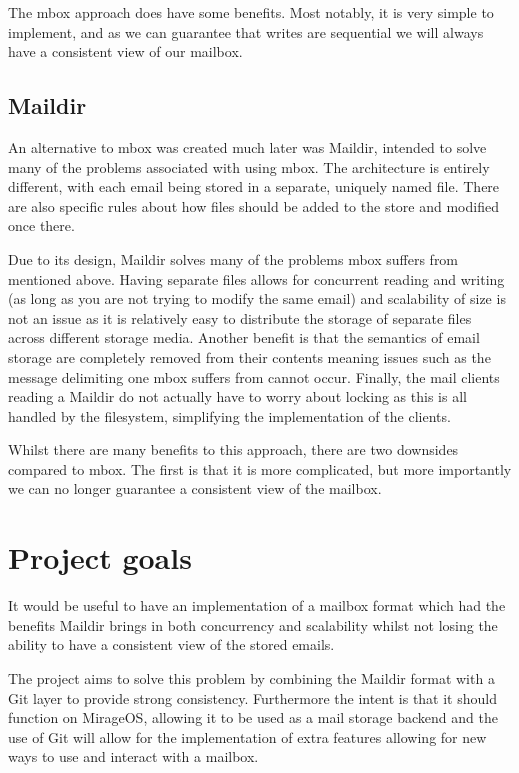 The mbox approach does have some benefits. Most notably, it is very simple to implement, and as we can guarantee that writes are sequential we will always have a consistent view of our mailbox.

\subsection{Maildir}

An alternative to mbox was created much later was Maildir, intended to solve many of the problems associated with using mbox. The architecture is entirely different, with each email being stored in a separate, uniquely named file. There are also specific rules about how files should be added to the store and modified once there.

Due to its design, Maildir solves many of the problems mbox suffers from mentioned above. Having separate files allows for concurrent reading and writing (as long as you are not trying to modify the same email) and scalability of size is not an issue as it is relatively easy to distribute the storage of separate files across different storage media. Another benefit is that the semantics of email storage are completely removed from their contents meaning issues such as the message delimiting one mbox suffers from cannot occur. Finally, the mail clients reading a Maildir do not actually have to worry about locking as this is all handled by the filesystem, simplifying the implementation of the clients.

Whilst there are many benefits to this approach, there are two downsides compared to mbox. The first is that it is more complicated, but more importantly we can no longer guarantee a consistent view of the mailbox.

\section{Project goals}

It would be useful to have an implementation of a mailbox format which had the benefits Maildir brings in both concurrency and scalability whilst not losing the ability to have a consistent view of the stored emails.

The project aims to solve this problem by combining the Maildir format with a Git layer to provide strong consistency. Furthermore the intent is that it should function on MirageOS, allowing it to be used as a mail storage backend and the use of Git will allow for the implementation of extra features allowing for new ways to use and interact with a mailbox.
